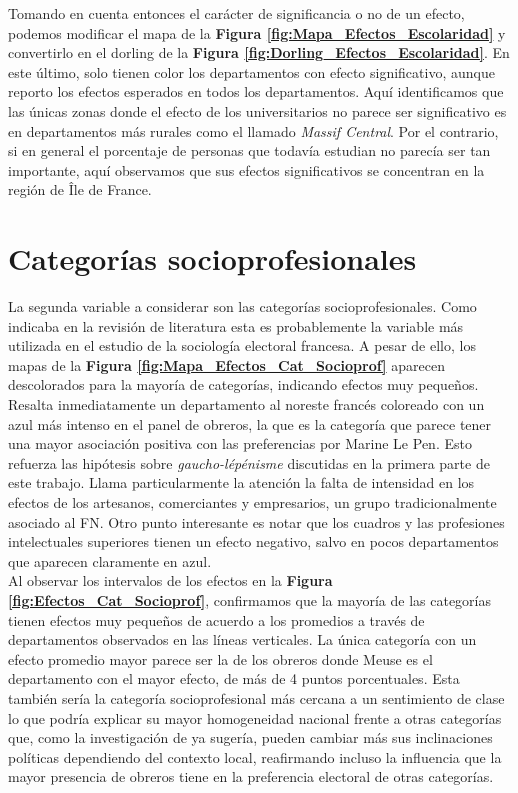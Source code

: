 Tomando en cuenta entonces el carácter de significancia o no de un efecto, podemos modificar el mapa de la \textbf{Figura \ref{fig:Mapa_Efectos_Escolaridad}} y convertirlo en el dorling de la \textbf{Figura \ref{fig:Dorling_Efectos_Escolaridad}}. En este último, solo tienen color los departamentos con efecto significativo, aunque reporto los efectos esperados en todos los departamentos. Aquí identificamos que las únicas zonas donde el efecto de los universitarios no parece ser significativo es en departamentos más rurales como el llamado \textit{Massif Central}. Por el contrario, si en general el porcentaje de personas que todavía estudian no parecía ser tan importante, aquí observamos que sus efectos significativos se concentran en la región de Île de France. 

\section{Categorías socioprofesionales}

La segunda variable a considerar son las categorías socioprofesionales. Como indicaba en la revisión de literatura esta es probablemente la variable más utilizada en el estudio de la sociología electoral francesa. A pesar de ello, los mapas de la \textbf{Figura \ref{fig:Mapa_Efectos_Cat_Socioprof}} aparecen descolorados para la mayoría de categorías, indicando efectos muy pequeños. Resalta inmediatamente un departamento al noreste francés coloreado con un azul más intenso en el panel de obreros, la que es la categoría que parece tener una mayor asociación positiva con las preferencias por Marine Le Pen. Esto refuerza las hipótesis sobre \textit{gaucho-lépénisme} discutidas en la primera parte de este trabajo. Llama particularmente la atención la falta de intensidad en los efectos de los artesanos, comerciantes y empresarios, un grupo tradicionalmente asociado al FN. Otro punto interesante es notar que los cuadros y las profesiones intelectuales superiores tienen un efecto negativo, salvo en pocos departamentos que aparecen claramente en azul.\\ 

Al observar los intervalos de los efectos en la \textbf{Figura \ref{fig:Efectos_Cat_Socioprof}}, confirmamos que la mayoría de las categorías tienen efectos muy pequeños de acuerdo a los promedios a través de departamentos observados en las líneas verticales. La única categoría con un efecto promedio mayor parece ser la de los obreros donde Meuse es el departamento con el mayor efecto, de más de 4 puntos porcentuales. Esta también sería la categoría socioprofesional más cercana a un sentimiento de clase lo que podría explicar su mayor homogeneidad nacional frente a otras categorías que, como la investigación de \textcite{MayerMichelat81} ya sugería, pueden cambiar más sus inclinaciones políticas dependiendo del contexto local, reafirmando incluso la influencia que la mayor presencia de obreros tiene en la preferencia electoral de otras categorías.\\ 


